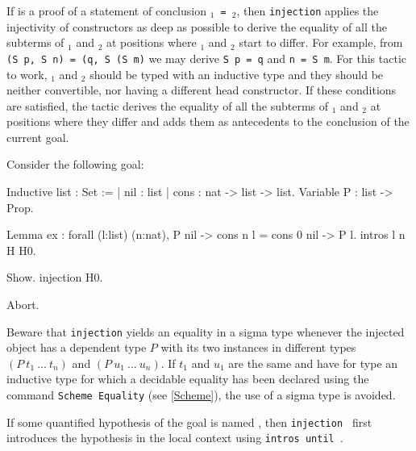\begin{coq_example*}
If {\term} is a proof of a statement of conclusion
 {\tt {\term$_1$} = {\term$_2$}},
then {\tt injection} applies the injectivity of constructors as deep as possible to
derive the equality of all the subterms of {\term$_1$} and {\term$_2$} at positions
where {\term$_1$} and {\term$_2$} start to differ.
For example, from {\tt (S p, S n) = (q, S (S m)} we may derive {\tt S
  p = q} and {\tt n = S m}. For this tactic to work, {\term$_1$} and
{\term$_2$} should be typed with an inductive
type and they should be neither convertible, nor having a different
head constructor. If these conditions are satisfied, the tactic
derives the equality of all the subterms of {\term$_1$} and
{\term$_2$} at positions where they differ and adds them as
antecedents to the conclusion of the current goal.

\Example Consider the following goal:

\begin{coq_example*}
Inductive list : Set :=
  | nil : list
  | cons : nat -> list -> list.
Variable P : list -> Prop.
\end{coq_example*}
\begin{coq_eval}
Lemma ex :
 forall (l:list) (n:nat), P nil -> cons n l = cons 0 nil -> P l.
intros l n H H0.
\end{coq_eval}
\begin{coq_example}
Show.
injection H0.
\end{coq_example}
\begin{coq_eval}
Abort.
\end{coq_eval}

Beware that \texttt{injection} yields an equality in a sigma type
whenever the injected object has a dependent type $P$ with its two
instances in different types $(P~t_1~...~t_n)$ and
$(P~u_1~...~u_n)$. If $t_1$ and $u_1$ are the same and have for type
an inductive type for which a decidable equality has been declared
using the command {\tt Scheme Equality} (see \ref{Scheme}), the use of
a sigma type is avoided.

\Rem If some quantified hypothesis of the goal is named {\ident}, then
{\tt injection {\ident}} first introduces the hypothesis in the local
context using \texttt{intros until \ident}.

\begin{ErrMsgs}
\item {}
\item {}
\item {}
\item {}
\end{ErrMsgs}


\end{coq_example*}
